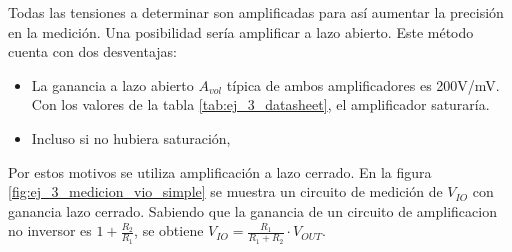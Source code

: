 \documentclass[../../main.tex]{subfiles}
\begin{document}
Todas las tensiones a determinar son amplificadas para as\'i aumentar la precisi\'on en la medici\'on. Una posibilidad ser\'ia amplificar a lazo abierto. Este m\'etodo cuenta con dos desventajas:
\begin{itemize}	%
	\item La ganancia a lazo abierto $A_{vol}$ t\'ipica de ambos amplificadores es 200V/mV. Con los valores de la tabla \ref{tab:ej_3_datasheet}, el amplificador saturar\'ia.
	\item Incluso si no hubiera saturaci\'on, 
\end{itemize}
Por estos motivos se utiliza amplificaci\'on a lazo cerrado. En la figura \ref{fig:ej_3_medicion_vio_simple} se muestra un circuito de medici\'on de $V_{IO}$ con ganancia lazo cerrado. Sabiendo que la ganancia de un circuito de amplificacion no inversor es $1+\frac{R_2}{R_1}$, se obtiene $V_{IO}=\frac{R_1}{R_1+R_2}\cdot V_{OUT}$. 
\end{document}
